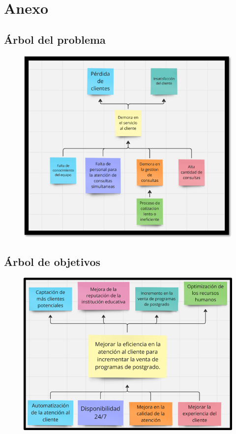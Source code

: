 \documentclass[10pt,a4paper]{article}
\begin{document}
	
	\section{Anexo}
		    
	\subsection{Árbol del problema}

	\begin{figure}[H]
		\includegraphics[scale=1]{ArbolProblema.png} \hfill 
	\end{figure}
 

    \subsection{Árbol de objetivos}

	
	\begin{figure}[H]
		\includegraphics[scale=0.80]{ArbolObjetivos.png} \hfill 
	\end{figure}
  
\end{document}
